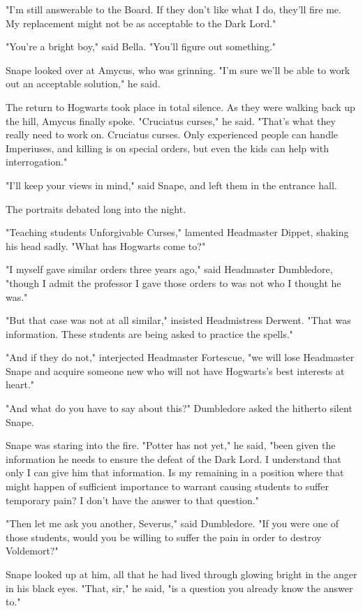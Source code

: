 "I'm still answerable to the Board. If they don't like what I do, they'll fire me. My replacement might not be as acceptable to the Dark Lord."

"You're a bright boy," said Bella. "You'll figure out something."

Snape looked over at Amycus, who was grinning. "I'm sure we'll be able to work out an acceptable solution," he said.

The return to Hogwarts took place in total silence. As they were walking back up the hill, Amycus finally spoke. "Cruciatus curses," he said. "That's what they really need to work on. Cruciatus curses. Only experienced people can handle Imperiuses, and killing is on special orders, but even the kids can help with interrogation."

"I'll keep your views in mind," said Snape, and left them in the entrance hall.

The portraits debated long into the night.

"Teaching students Unforgivable Curses," lamented Headmaster Dippet, shaking his head sadly. "What has Hogwarts come to?"

"I myself gave similar orders three years ago," said Headmaster Dumbledore, "though I admit the professor I gave those orders to was not who I thought he was."

"But that case was not at all similar," insisted Headmistress Derwent. "That was information. These students are being asked to practice the spells."

"And if they do not," interjected Headmaster Fortescue, "we will lose Headmaster Snape and acquire someone new who will not have Hogwarts's best interests at heart."

"And what do you have to say about this?" Dumbledore asked the hitherto silent Snape.

Snape was staring into the fire. "Potter has not yet," he said, "been given the information he needs to ensure the defeat of the Dark Lord. I understand that only I can give him that information. Is my remaining in a position where that might happen of sufficient importance to warrant causing students to suffer temporary pain? I don't have the answer to that question."

"Then let me ask you another, Severus," said Dumbledore. "If you were one of those students, would you be willing to suffer the pain in order to destroy Voldemort?"

Snape looked up at him, all that he had lived through glowing bright in the anger in his black eyes. "That, sir," he said, "is a question you already know the answer to."

